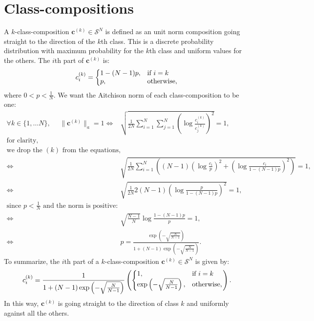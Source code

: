 \documentclass{article}
\theoremstyle{plain}
\theoremstyle{definition}
\theoremstyle{remark}
\begin{document}
\newpage
\section{Class-compositions}
\label{app:classcompo}
A $k$-class-composition $\bm{c}^{(k)}  \in \mathcal{S}^N$ is defined as an unit norm composition going straight to the direction of the $k$th class. This is a discrete probability distribution with maximum probability for the $k$th class and uniform values for the others. The $i$th part of $\bm{c}^{(k)}$ is:
\begin{equation}
    c_i^{(k)} = \left\lbrace
  \begin{array}{@{}ll@{}}
    1-(N-1)p, & \text{if}\ i=k \\
    p, & \text{otherwise,}
  \end{array}\right.
\end{equation}
where $0<p<\frac{1}{N}$. We want the Aitchison norm of each class-composition to be one:
\begin{equation}
  \begin{aligned}
    \forall k \in \{1, \dots N \},~~~~~~\lVert \bm{c}^{(k)} \rVert_a = 1 \iff& \sqrt{\frac{1}{2N} \sum_{i=1}^N \sum_{j=1}^N \left( \log \frac{c_i^{(k)}}{c_j^{(k)}} \right)^2} = 1,\\
    \text{for clarity,}&\\\text{we drop the $(k)$ from the equations,}&\\
    \iff& \sqrt{\frac{1}{2N} \sum_{i=1}^{N}\left( \left(N-1 \right) \left( \log \frac{c_i}{p} \right)^2 + \left( \log \frac{c_i}{1-(N-1)p} \right)^2 \right)} = 1,\\
    \iff& \sqrt{\frac{1}{2N} 2(N-1) \left( \log \frac{p}{1-(N-1)p} \right)^2} =1,\\
    \text{since $p<\frac{1}{N}$ and the norm is positive:}&\\
    \iff& \sqrt{\frac{N-1}{N}}\log \frac{1-(N-1)p}{p} =1,\\
    \iff& p = \frac{\exp \left( -\sqrt{\frac{N}{N-1}} \right)}{1+ (N-1)\exp \left( -\sqrt{\frac{N}{N-1}} \right )}.
  \end{aligned}
\end{equation}
To summarize, the $i$th part of a $k$-class-composition $\bm{c}^{(k)} \in \mathcal{S}^N$ is given by:
\begin{equation}
    c_i^{(k)} =
  \frac{1}{1+ (N-1)\exp \left( -\sqrt{\frac{N}{N-1}} \right )} \left( \left\lbrace \begin{array}{@{}ll@{}}
     1, & \text{if}\ i=k \\
     \exp \left( -\sqrt{\frac{N}{N-1}} \right), & \text{otherwise,}
  \end{array}\right.\right).
\end{equation}
In this way, $\bm{c}^{(k)}$ is going straight to the direction of class $k$ and uniformly against all the others.
\end{document}
